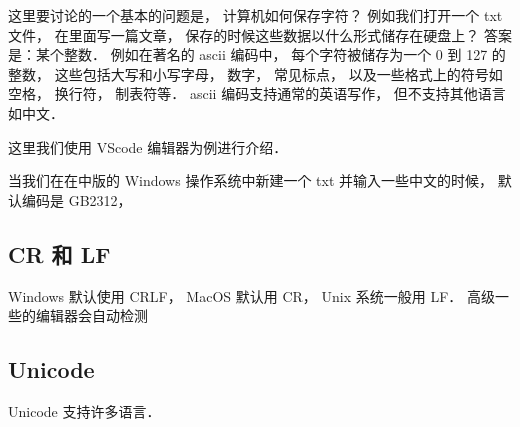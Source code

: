 
这里要讨论的一个基本的问题是， 计算机如何保存字符？ 例如我们打开一个 txt 文件， 在里面写一篇文章， 保存的时候这些数据以什么形式储存在硬盘上？ 答案是：某个整数． 例如在著名的 ascii 编码中， 每个字符被储存为一个 0 到 127 的整数， 这些包括大写和小写字母， 数字， 常见标点， 以及一些格式上的符号如空格， 换行符， 制表符等． ascii 编码支持通常的英语写作， 但不支持其他语言如中文．

这里我们使用 VScode 编辑器为例进行介绍． 

当我们在在中版的 Windows 操作系统中新建一个 txt 并输入一些中文的时候， 默认编码是 GB2312，

\subsection{CR 和 LF}
Windows 默认使用 CRLF， MacOS 默认用 CR， Unix 系统一般用 LF． 高级一些的编辑器会自动检测

\subsection{Unicode}
Unicode 支持许多语言．
